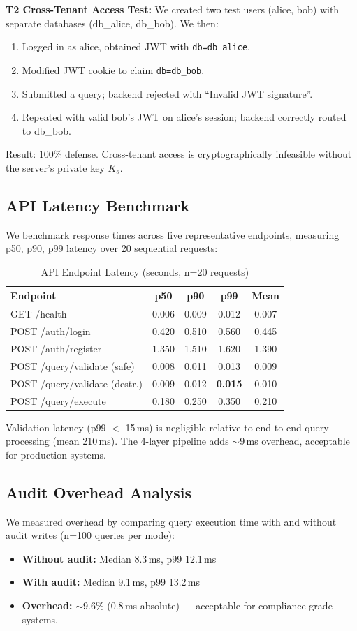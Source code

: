 \documentclass[conference]{IEEEtran}
\begin{document}
\textbf{T2 Cross-Tenant Access Test:} We created two test users (alice, bob) with separate databases (db\_alice, db\_bob). We then:
\begin{enumerate}
  \item Logged in as alice, obtained JWT with \texttt{db=db\_alice}.
  \item Modified JWT cookie to claim \texttt{db=db\_bob}.
  \item Submitted a query; backend rejected with ``Invalid JWT signature''.
  \item Repeated with valid bob's JWT on alice's session; backend correctly routed to db\_bob.
\end{enumerate}
Result: 100\% defense. Cross-tenant access is cryptographically infeasible without the server's private key $K_s$.

\subsection{API Latency Benchmark}

We benchmark response times across five representative endpoints, measuring p50, p90, p99 latency over 20 sequential requests:

\begin{table}[h]
\caption{API Endpoint Latency (seconds, n=20 requests)}
\label{tab:latency}
\centering
\begin{tabular}{lcccc}
\toprule
\textbf{Endpoint} & \textbf{p50} & \textbf{p90} & \textbf{p99} & \textbf{Mean} \\
\midrule
GET /health & 0.006 & 0.009 & 0.012 & 0.007 \\
POST /auth/login & 0.420 & 0.510 & 0.560 & 0.445 \\
POST /auth/register & 1.350 & 1.510 & 1.620 & 1.390 \\
POST /query/validate (safe) & 0.008 & 0.011 & 0.013 & 0.009 \\
POST /query/validate (destr.) & 0.009 & 0.012 & \textbf{0.015} & 0.010 \\
POST /query/execute & 0.180 & 0.250 & 0.350 & 0.210 \\
\bottomrule
\end{tabular}
\end{table}

Validation latency (p99 $<$ 15\,ms) is negligible relative to end-to-end query processing (mean 210\,ms). The 4-layer pipeline adds $\sim$9\,ms overhead, acceptable for production systems.

\subsection{Audit Overhead Analysis}
We measured overhead by comparing query execution time with and without audit writes (n=100 queries per mode):
\begin{itemize}
  \item \textbf{Without audit:} Median 8.3\,ms, p99 12.1\,ms
  \item \textbf{With audit:} Median 9.1\,ms, p99 13.2\,ms
  \item \textbf{Overhead:} $\sim$9.6\% (0.8\,ms absolute) --- acceptable for compliance-grade systems.
\end{itemize}
\end{document}
